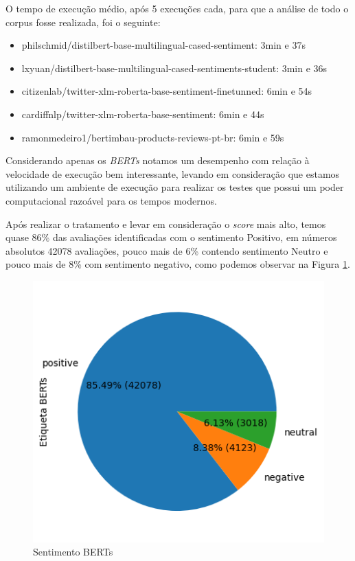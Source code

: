 O tempo de execução médio, após 5 execuções cada, para que a análise de todo o corpus fosse realizada, foi o seguinte:

\begin{itemize}
	\item philschmid/distilbert-base-multilingual-cased-sentiment: 3min e 37s
	\item lxyuan/distilbert-base-multilingual-cased-sentiments-student: 3min e 36s
	\item citizenlab/twitter-xlm-roberta-base-sentiment-finetunned: 6min e 54s
	\item cardiffnlp/twitter-xlm-roberta-base-sentiment: 6min e 44s
	\item ramonmedeiro1/bertimbau-products-reviews-pt-br: 6min e 59s
\end{itemize}

Considerando apenas os \textit{BERTs} notamos um desempenho com relação à velocidade de execução bem interessante, levando em consideração que estamos utilizando um ambiente de execução para realizar os testes que possui um poder computacional razoável para os tempos modernos.

Após realizar o tratamento e levar em consideração o \textit{score} mais alto, temos quase 86\% das avaliações identificadas com o sentimento Positivo, em números absolutos 42078 avaliações, pouco mais de 6\% contendo sentimento Neutro e pouco mais de 8\% com sentimento negativo, como podemos observar na Figura \ref{img:sentimento_bert}.

\begin{figure}
	\centering
	\includegraphics[width=.7\textwidth]{figs/bert/distribuicao_pizza.png}
	\caption{Sentimento BERTs}
	\label{img:sentimento_bert}
\end{figure}

